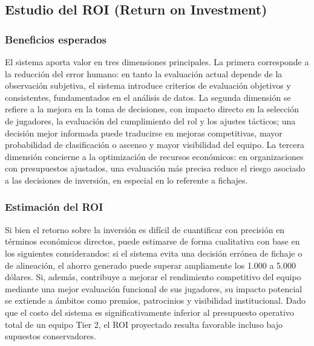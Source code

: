 \documentclass{ULBreport} %
\begin{document}
\subsection{Estudio del ROI (Return on Investment)}

\subsubsection{Beneficios esperados}

El sistema aporta valor en tres dimensiones principales. La primera corresponde a la reducción del error humano: en tanto la evaluación actual depende de la observación subjetiva, el sistema introduce criterios de evaluación objetivos y consistentes, fundamentados en el análisis de datos. La segunda dimensión se refiere a la mejora en la toma de decisiones, con impacto directo en la selección de jugadores, la evaluación del cumplimiento del rol y los ajustes tácticos; una decisión mejor informada puede traducirse en mejoras competitivas, mayor probabilidad de clasificación o ascenso y mayor visibilidad del equipo. La tercera dimensión concierne a la optimización de recursos económicos: en organizaciones con presupuestos ajustados, una evaluación más precisa reduce el riesgo asociado a las decisiones de inversión, en especial en lo referente a fichajes.

\subsubsection{Estimación del ROI}

Si bien el retorno sobre la inversión es difícil de cuantificar con precisión en términos económicos directos, puede estimarse de forma cualitativa con base en los siguientes considerandos: si el sistema evita una decisión errónea de fichaje o de alineación, el ahorro generado puede superar ampliamente los 1.000 a 5.000 dólares. Si, además, contribuye a mejorar el rendimiento competitivo del equipo mediante una mejor evaluación funcional de sus jugadores, su impacto potencial se extiende a ámbitos como premios, patrocinios y visibilidad institucional. Dado que el costo del sistema es significativamente inferior al presupuesto operativo total de un equipo Tier 2, el ROI proyectado resulta favorable incluso bajo supuestos conservadores.

\end{document}
